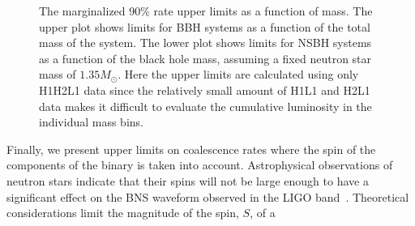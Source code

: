 \begin{figure}[ht]
  \caption{The marginalized 90\% rate upper limits as a function of mass.  The
upper plot shows limits for BBH systems as a function of the
total mass of the system.  The lower plot shows limits for NSBH
systems as a function of the black hole mass, assuming a fixed
neutron star mass of $1.35 M_{\odot}$. Here the upper limits are 
calculated using only H1H2L1 data since the relatively small amount
of H1L1 and H2L1 data makes it difficult to 
evaluate the cumulative luminosity in the individual mass bins.} 
  \label{fig:ulmass}
\end{figure}
Finally, we present upper limits on coalescence rates where the spin of
the components of the binary is taken into account.  Astrophysical
observations of neutron stars indicate that their spins will not be
large enough to have a significant effect on the BNS waveform
observed in the LIGO band~\cite{ATNF:psrcat,Apostolatos:1994}.
Theoretical considerations limit the magnitude of the spin, $S$, of a
